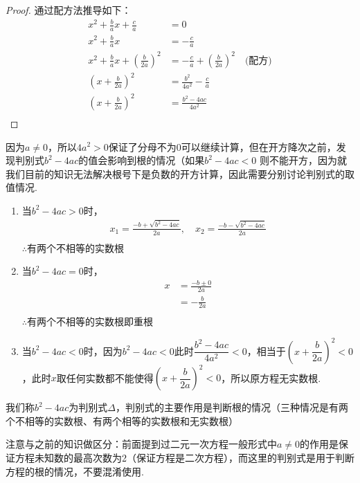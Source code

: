 \documentclass[lang=cn, 10pt, titlestyle=hang, oneside]{elegantbook}
\begin{document}
\begin{proof}
通过配方法推导如下：
\begin{align*}
    x^2 + \frac{b}{a}x + \frac{c}{a} &= 0\\
    x^2 + \frac{b}{a}x &= -\frac{c}{a}\\
    x^2 + \frac{b}{a}x + \left(\frac{b}{2a}\right)^2 &= -\frac{c}{a} + \left(\frac{b}{2a}\right)^2 \quad \text{(配方)} \\
    \left(x + \frac{b}{2a}\right)^2 &= \frac{b^2}{4a^2} - \frac{c}{a}\\
    \left(x + \frac{b}{2a}\right)^2 &= \frac{b^2 - 4ac}{4a^2}\\
\end{align*}
\end{proof}
因为\(a\ne0\)，所以\(4a^2>0\)保证了分母不为0可以继续计算，但在开方降次之前，发现判别式\(b^2 - 4ac\)的值会影响到根的情况（如果$b^2 - 4ac<0$ 则不能开方，因为就我们目前的知识无法解决根号下是负数的开方计算，因此需要分别讨论判别式的取值情况.
\begin{enumerate}
    \item 当\(b^2 - 4ac>0\)时，
    \begin{align*}
        x_1 = \frac{-b + \sqrt{b^2 - 4ac}}{2a}, \quad x_2 = \frac{-b - \sqrt{b^2 - 4ac}}{2a}\\
    \end{align*}
    $\therefore \text{有两个不相等的实数根}$
    \item 当\(b^2 - 4ac=0\)时，
    \begin{align*}
         x &= \frac{-b \pm 0}{2a}\\
    &= -\frac{b}{2a}\\
    \end{align*}
    $\therefore \text{有两个不相等的实数根即重根}$
    \item 当\(b^2 - 4ac<0\)时，因为\(b^2 - 4ac<0\)此时\(\dfrac{b^2 - 4ac}{4a^2}<0\)，相当于\((x + \dfrac{b}{2a})^2<0\)，此时\(x\)取任何实数都不能使得\((x + \dfrac{b}{2a})^2<0\)，所以原方程无实数根.

\end{enumerate}
\par
我们称\(b^2 - 4ac\)为判别式\(\Delta\)，判别式的主要作用是判断根的情况（三种情况是有两个不相等的实数根、有两个相等的实数根和无实数根）
\par
\begin{remark}
注意与之前的知识做区分：前面提到过二元一次方程一般形式中\(a\ne0\)的作用是保证方程未知数的最高次数为2（保证方程是二次方程），而这里的判别式是用于判断方程的根的情况，不要混淆使用. 
\end{remark}
\end{document}
